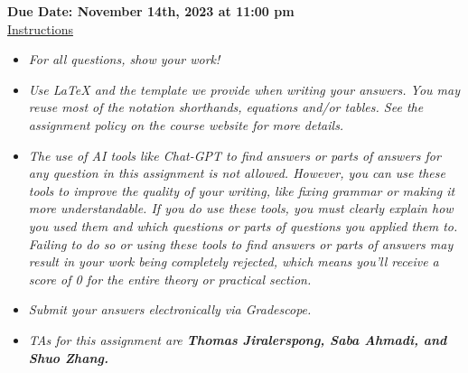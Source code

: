 \documentclass[12pt]{article}
\theoremstyle{definition}
\begin{document}
\fancyhead{}
\fancyfoot{}


\vspace{1cm}

\shorthandoff{:}
{\textbf{Due Date: November 14th, 2023 at 11:00 pm}}\\


\vspace{-0.5cm}
\underline{Instructions}%
\renewcommand{\labelitemi}{\textbullet}

\begin{itemize}
\item \emph{For all questions, show your work!}
\item \emph{Use LaTeX and the template we provide when writing your answers.
You may reuse most of the notation shorthands, equations and/or tables.
See the assignment policy on the course website for more details.}
\item \emph{The use of AI tools like Chat-GPT to find answers or parts of answers for any question in this assignment is not allowed. However, you can use these tools to improve the quality of your writing, like fixing grammar or making it more understandable. If you do use these tools, you must clearly explain how you used them and which questions or parts of questions you applied them to. Failing to do so or using these tools to find answers or parts of answers may result in your work being completely rejected, which means you'll receive a score of 0 for the entire theory or practical section.}
\item \emph{Submit your answers electronically via Gradescope.}
\item \emph{TAs for this assignment are \textbf{Thomas Jiralerspong, Saba Ahmadi, and Shuo Zhang.}}
\end{itemize}
\end{document}
